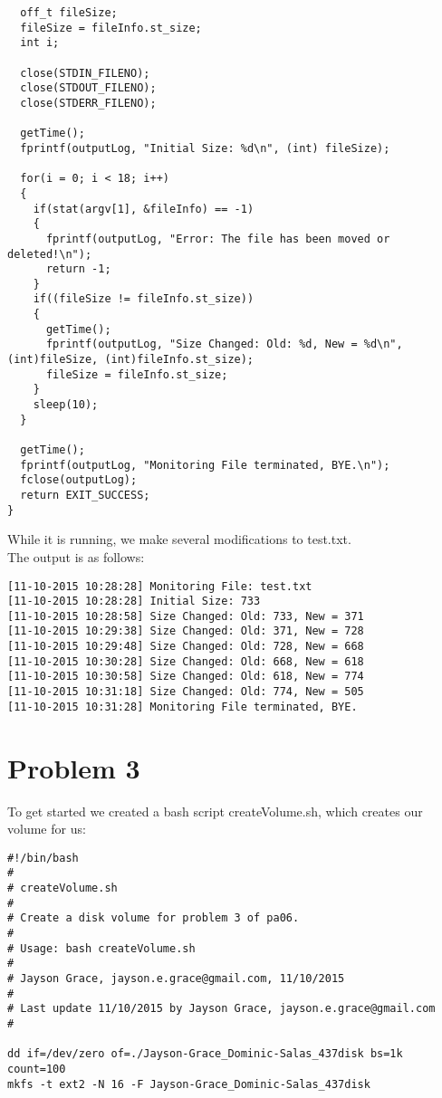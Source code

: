 \documentclass[12pt, a4paper, oneside]{article}
\begin{document}
\begin{lstlisting}
  off_t fileSize;
  fileSize = fileInfo.st_size;
  int i;

  close(STDIN_FILENO);
  close(STDOUT_FILENO);
  close(STDERR_FILENO);

  getTime();
  fprintf(outputLog, "Initial Size: %d\n", (int) fileSize);

  for(i = 0; i < 18; i++)
  {
    if(stat(argv[1], &fileInfo) == -1)
    {
      fprintf(outputLog, "Error: The file has been moved or deleted!\n");
      return -1;
    }
    if((fileSize != fileInfo.st_size))
    {
      getTime();
      fprintf(outputLog, "Size Changed: Old: %d, New = %d\n", (int)fileSize, (int)fileInfo.st_size);
      fileSize = fileInfo.st_size;
    }
    sleep(10);
  }

  getTime();
  fprintf(outputLog, "Monitoring File terminated, BYE.\n");
  fclose(outputLog);
  return EXIT_SUCCESS;
}
\end{lstlisting}

While it is running, we make several modifications to test.txt. \\

The output is as follows: \\
\begin{lstlisting}
[11-10-2015 10:28:28] Monitoring File: test.txt
[11-10-2015 10:28:28] Initial Size: 733
[11-10-2015 10:28:58] Size Changed: Old: 733, New = 371
[11-10-2015 10:29:38] Size Changed: Old: 371, New = 728
[11-10-2015 10:29:48] Size Changed: Old: 728, New = 668
[11-10-2015 10:30:28] Size Changed: Old: 668, New = 618
[11-10-2015 10:30:58] Size Changed: Old: 618, New = 774
[11-10-2015 10:31:18] Size Changed: Old: 774, New = 505
[11-10-2015 10:31:28] Monitoring File terminated, BYE.
\end{lstlisting}

\section*{Problem 3}
To get started we created a bash script createVolume.sh, which creates our volume for us: 
\begin{lstlisting}
#!/bin/bash
#
# createVolume.sh
#
# Create a disk volume for problem 3 of pa06.
#
# Usage: bash createVolume.sh
#
# Jayson Grace, jayson.e.grace@gmail.com, 11/10/2015
#
# Last update 11/10/2015 by Jayson Grace, jayson.e.grace@gmail.com
# 

dd if=/dev/zero of=./Jayson-Grace_Dominic-Salas_437disk bs=1k count=100
mkfs -t ext2 -N 16 -F Jayson-Grace_Dominic-Salas_437disk
\end{lstlisting}
\end{document}
